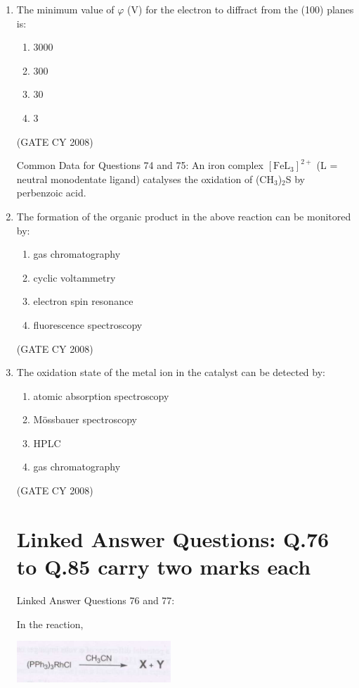 \documentclass[12pt]{article}
\begin{document}
\begin{enumerate}
    \item The minimum value of $\varphi$ (V) for the electron to diffract from the (100) planes is:
    \begin{enumerate}
        \item 3000
        \item 300
        \item 30
        \item 3
    \end{enumerate}
    \hfill{(GATE CY 2008)}


{Common Data for Questions 74 and 75:} 
An iron complex $[\text{FeL}_3]^{2+}$ (L = neutral monodentate ligand) catalyses the oxidation of (CH$_3$)$_2$S by perbenzoic acid.


    \item The formation of the organic product in the above reaction can be monitored by:
    \begin{enumerate}
        \item gas chromatography
        \item cyclic voltammetry
        \item electron spin resonance
        \item fluorescence spectroscopy
    \end{enumerate}    \hfill{(GATE CY 2008)}


    \item The oxidation state of the metal ion in the catalyst can be detected by:
    \begin{enumerate}
        \item atomic absorption spectroscopy
        \item M\"ossbauer spectroscopy
        \item HPLC
        \item gas chromatography
    \end{enumerate}
  \hfill{(GATE CY 2008)}


\section{Linked Answer Questions: Q.76 to Q.85 carry two marks each}

{Linked Answer Questions 76 and 77:}

In the reaction,

\begin{center}
\includegraphics[width=0.6\columnwidth]{figs/q76 1.png}
\end{center} 



\end{enumerate}
\end{document}
